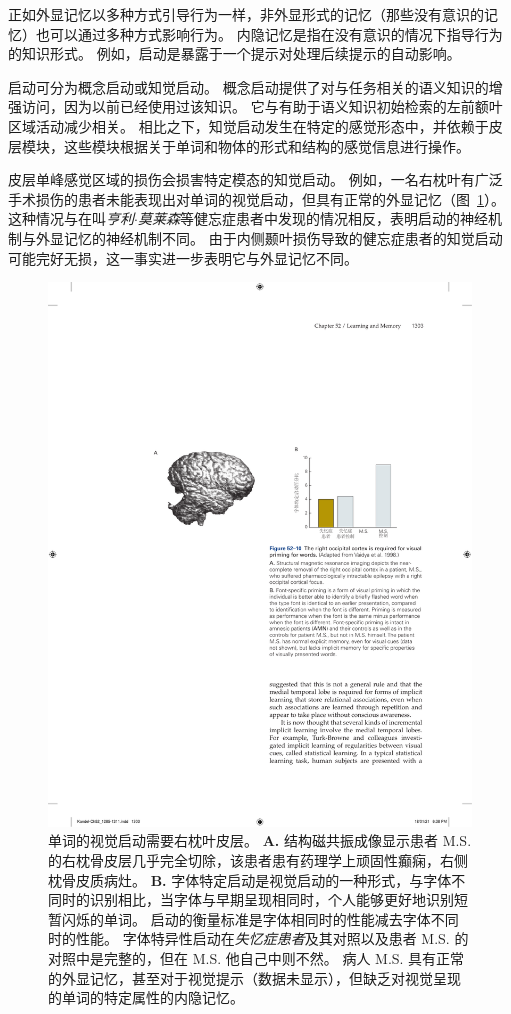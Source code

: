 正如外显记忆以多种方式引导行为一样，非外显形式的记忆（那些没有意识的记忆）也可以通过多种方式影响行为。
内隐记忆是指在没有意识的情况下指导行为的知识形式。
例如，启动是暴露于一个提示对处理后续提示的自动影响。


启动可分为概念启动或知觉启动。
概念启动提供了对与任务相关的语义知识的增强访问，因为以前已经使用过该知识。
它与有助于语义知识初始检索的左前额叶区域活动减少相关。
相比之下，知觉启动发生在特定的感觉形态中，并依赖于皮层模块，这些模块根据关于单词和物体的形式和结构的感觉信息进行操作。


皮层单峰感觉区域的损伤会损害特定模态的知觉启动。
例如，一名右枕叶有广泛手术损伤的患者未能表现出对单词的视觉启动，但具有正常的外显记忆（图~\ref{fig:52_10}）。
这种情况与在叫\textit{亨利$\cdot$莫莱森}等健忘症患者中发现的情况相反，表明启动的神经机制与外显记忆的神经机制不同。
由于内侧颞叶损伤导致的健忘症患者的知觉启动可能完好无损，这一事实进一步表明它与外显记忆不同。


\begin{figure}[htbp]
	\centering
	\includegraphics[width=0.92\linewidth]{chap52/fig_52_10}
	\caption{单词的视觉启动需要右枕叶皮层\cite{vaidya1998font}。
		\textbf{A.} 结构磁共振成像显示患者 M.S. 的右枕骨皮层几乎完全切除，该患者患有药理学上顽固性癫痫，右侧枕骨皮质病灶。
		\textbf{B.} 字体特定启动是视觉启动的一种形式，与字体不同时的识别相比，当字体与早期呈现相同时，个人能够更好地识别短暂闪烁的单词。
		启动的衡量标准是字体相同时的性能减去字体不同时的性能。
		字体特异性启动在\textit{失忆症患者}及其对照以及患者 M.S. 的对照中是完整的，但在 M.S. 他自己中则不然。
		病人 M.S. 具有正常的外显记忆，甚至对于视觉提示（数据未显示），但缺乏对视觉呈现的单词的特定属性的内隐记忆。}
	\label{fig:52_10}
\end{figure}



